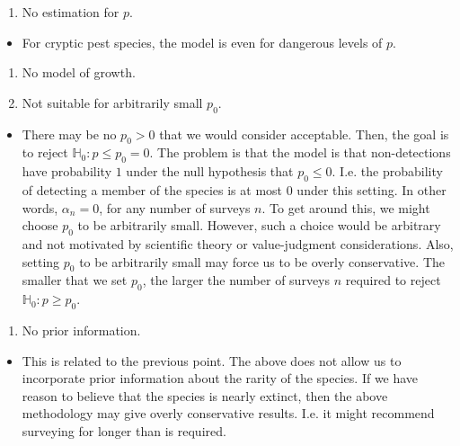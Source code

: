 \documentclass[
]{book}
\providecommand{\tightlist}{%
  \setlength{\itemsep}{0pt}\setlength{\parskip}{0pt}}
\begin{document}
\begin{enumerate}
\def\labelenumi{\arabic{enumi}.}
\setcounter{enumi}{1}
\tightlist
\item
  No estimation for \(p\).
\end{enumerate}

\begin{itemize}
\tightlist
\item
  For cryptic pest species, the model is even for dangerous levels of \(p\).
\end{itemize}

\begin{enumerate}
\def\labelenumi{\arabic{enumi}.}
\setcounter{enumi}{2}
\tightlist
\item
  No model of growth.
\item
  Not suitable for arbitrarily small \(p_0\).
\end{enumerate}

\begin{itemize}
\tightlist
\item
  There may be no \(p_0 > 0\) that we would consider acceptable. Then, the goal is to reject \(\mathbb H_0: p \leq p_0 = 0\). The problem is that the model is that non-detections have probability \(1\) under the null hypothesis that \(p_0 \leq 0\). I.e. the probability of detecting a member of the species is at most \(0\) under this setting. In other words, \(\alpha_n = 0\), for any number of surveys \(n\). To get around this, we might choose \(p_0\) to be arbitrarily small. However, such a choice would be arbitrary and not motivated by scientific theory or value-judgment considerations. Also, setting \(p_0\) to be arbitrarily small may force us to be overly conservative. The smaller that we set \(p_0\), the larger the number of surveys \(n\) required to reject \(\mathbb H_0: p \geq p_0\).
\end{itemize}

\begin{enumerate}
\def\labelenumi{\arabic{enumi}.}
\setcounter{enumi}{4}
\tightlist
\item
  No prior information.
\end{enumerate}

\begin{itemize}
\tightlist
\item
  This is related to the previous point. The above does not allow us to incorporate prior information about the rarity of the species. If we have reason to believe that the species is nearly extinct, then the above methodology may give overly conservative results. I.e. it might recommend surveying for longer than is required.
\end{itemize}
\end{document}
